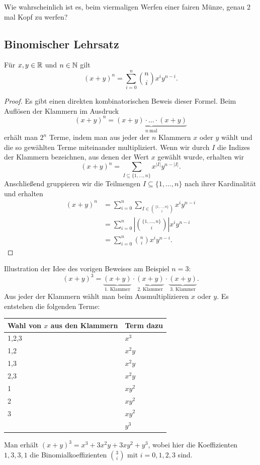 \begin{aufg}
	Wie wahrscheinlich ist es, beim viermaligen Werfen einer fairen Münze, genau $2$ mal Kopf zu werfen?
\end{aufg} 

\subsection{Binomischer Lehrsatz}

\begin{thm} 
	Für $x, y \in \mathbb{R}$ und $n \in \mathbb{N}$ gilt 
	\[
			(x+y)^n = \sum_{i=0}^n \binom{n}{i} x^i y^{n-i}. 
	\]
\end{thm} 
\begin{proof}
	Es gibt einen direkten kombinatorischen Beweis dieser Formel. Beim Auflösen der Klammern im Ausdruck 
	\[
			(x+y)^n = \underbrace{(x+y) \cdot \ldots \cdot (x+y)}_{n \ \text{mal}}
	\]
	erhält man $2^n$ Terme, indem man aus jeder der $n$ Klammern $x$ oder $y$ wählt und die so gewählten Terme miteinander multipliziert. Wenn wir durch $I$ die Indizes der Klammern bezeichnen, aus denen der Wert $x$ gewählt wurde, erhalten wir 
	\[
			(x+y)^n = \sum_{I \subseteq \{1,\ldots,n\}} x^{|I|} y^{n - |I|}. 
	\]
	Anschließend gruppieren wir die Teilmengen $I \subseteq \{1,\ldots,n\}$ nach ihrer Kardinalität und erhalten
	\begin{align*}
			(x+y)^n & =\sum_{i=0}^n \sum_{I \in \binom{\{1,\ldots,n\}}{i}} x^i y^{n-i} 
			\\ & = \sum_{i=0}^n \left| \binom{\{1,\ldots,n\}}{i} \right| x^i y^{n-i} 
			\\ & = \sum_{i=0}^n \binom{n}{i}  x^i y^{n-i}.
	\end{align*} 
\end{proof} 

\begin{bsp}
	Illustration der Idee des vorigen Beweises am Beispiel $n=3$: 
	\[
	(x+y)^3 = \underbrace{ (x+y) }_{\text{1. Klammer}} \cdot \underbrace{ (x+y) }_{\text{2. Klammer}} \cdot \underbrace{ (x+y) }_{\text{3. Klammer}}.
	\]
	Aus jeder der Klammern wählt man beim Ausmultiplizieren $x$ oder $y$. Es entstehen die folgenden Terme: 
	\begin{center} 
		\begin{tabular}{ll}
			Wahl von $x$ aus den Klammern & Term dazu 
			\\ \hline \hline 
			1,2,3 & $x^3$
			\\ \hline 1,2 &  $x^2 y$
			\\ 1,3 &  $x^2 y$
			\\ 2,3 &  $x^2 y$
			\\ \hline 1 & $x y^2$
			\\ 2 &  $x y^2$
			\\ 3 & $ x y^2$
			\\ \hline & $y^3$
		\end{tabular} 
	\end{center} 
	Man erhält $(x+y)^3 = x^3+ 3 x^2 y + 3 x y^2 + y^3$, wobei hier die Koeffizienten $1,3,3,1$ die Binomialkoeffizienten $\binom{3}{i}$ mit $i=0,1,2,3$ sind. 
\end{bsp} 

